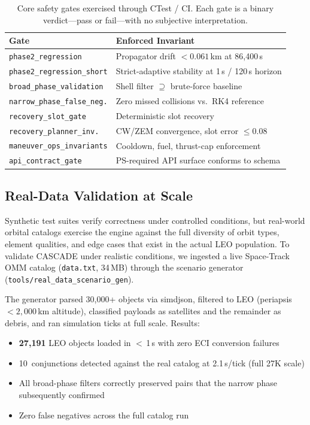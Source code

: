 \documentclass[10pt,twocolumn,letterpaper]{article}
\begin{document}
\begin{table}[h]
\centering\small
\begin{tabularx}{\linewidth}{@{}lX@{}}
\toprule
\textbf{Gate} & \textbf{Enforced Invariant} \\
\midrule
\texttt{phase2\_regression}        & Propagator drift $< 0.061$\,km at 86{,}400\,s \\
\texttt{phase2\_regression\_short} & Strict-adaptive stability at 1\,s / 120\,s horizon \\
\texttt{broad\_phase\_validation}  & Shell filter $\supseteq$ brute-force baseline \\
\texttt{narrow\_phase\_false\_neg.} & Zero missed collisions vs.\ RK4 reference \\
\texttt{recovery\_slot\_gate}      & Deterministic slot recovery \\
\texttt{recovery\_planner\_inv.}   & CW/ZEM convergence, slot error $\leq 0.08$ \\
\texttt{maneuver\_ops\_invariants} & Cooldown, fuel, thrust-cap enforcement \\
\texttt{api\_contract\_gate}       & PS-required API surface conforms to schema \\
\bottomrule
\end{tabularx}
\caption{Core safety gates exercised through CTest / CI.  Each gate is a
  binary verdict---pass or fail---with no subjective interpretation.}
\label{tab:gates}
\end{table}

\subsection{Real-Data Validation at Scale}

Synthetic test suites verify correctness under controlled conditions, but
real-world orbital catalogs exercise the engine against the full diversity
of orbit types, element qualities, and edge cases that exist in the actual
LEO population.  To validate CASCADE under realistic conditions, we
ingested a live Space-Track OMM catalog (\texttt{data.txt}, 34\,MB)
through the scenario generator (\texttt{tools/real\_data\_scenario\_gen}).

The generator parsed 30{,}000+ objects via simdjson, filtered to LEO
(periapsis $< 2{,}000$\,km altitude), classified payloads as satellites
and the remainder as debris, and ran simulation ticks at full scale.
Results:

\begin{itemize}[nosep,leftmargin=*]
  \item \textbf{27{,}191} LEO objects loaded in $<$\,1\,s with zero ECI
    conversion failures
  \item 10~conjunctions detected against the real catalog at 2.1\,s/tick
    (full 27K scale)
  \item All broad-phase filters correctly preserved pairs that the
    narrow phase subsequently confirmed
  \item Zero false negatives across the full catalog run
\end{itemize}
\end{document}

